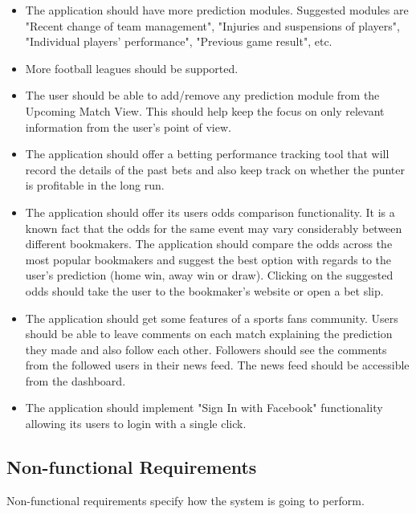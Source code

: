 \begin{itemize}
   \item The application should have more prediction modules. Suggested modules are "Recent change of team management", "Injuries and suspensions of players", "Individual players' performance", "Previous game result", etc.
   \item More football leagues should be supported.
   \item The user should be able to add/remove any prediction module from the Upcoming Match View. This should help keep the focus on only relevant information from the user's point of view.
   \item The application should offer a betting performance tracking tool that will record the details of the past bets and also keep track on whether the punter is profitable in the long run.
   \item The application should offer its users odds comparison functionality. It is a known fact that the odds for the same event may vary considerably between different bookmakers. The application should compare the odds across the most popular bookmakers and suggest the best option with regards to the user's prediction (home win, away win or draw). Clicking on the suggested odds should take the user to the bookmaker's website or open a bet slip.
   \item The application should get some features of a sports fans community. Users should be able to leave comments on each match explaining the prediction they made and also follow each other. Followers should see the comments from the followed users in their news feed. The news feed should be accessible from the dashboard. 
    \item The application should implement "Sign In with Facebook" functionality allowing its users to login with a single click.
\end{itemize}

\subsection{Non-functional Requirements}
\label{sec:nonfunctional_req}
Non-functional requirements specify how the system is going to perform.

